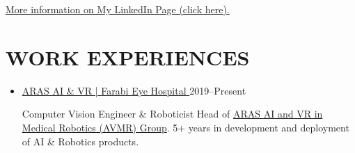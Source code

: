 \documentclass[11pt,a4paper,sans]{moderncv} %
\begin{document}
	\centerline{{{	\faLinkedin  \hspace{0.5 pt} \href{https://www.linkedin.com/in/mjahmadi/details/skills/}{More information on My LinkedIn Page (click here).}}}}

 
	\section{WORK EXPERIENCES}
	\begin{itemize}
		\item \href{https://aras.kntu.ac.ir/ai}{ ARAS AI \& VR |  \href{https://en.tums.ac.ir/en/page/97/farabi-hospital}{ Farabi Eye Hospital}  } \hfill 2019--Present
		
		Computer Vision Engineer \& Roboticist 
		 Head of \href{https://aras.kntu.ac.ir/ai}{ARAS AI and VR in Medical Robotics (AVMR) Group}. 5+ years in development and deployment of AI \& Robotics products.
			
			

\end{itemize}
\end{document}

